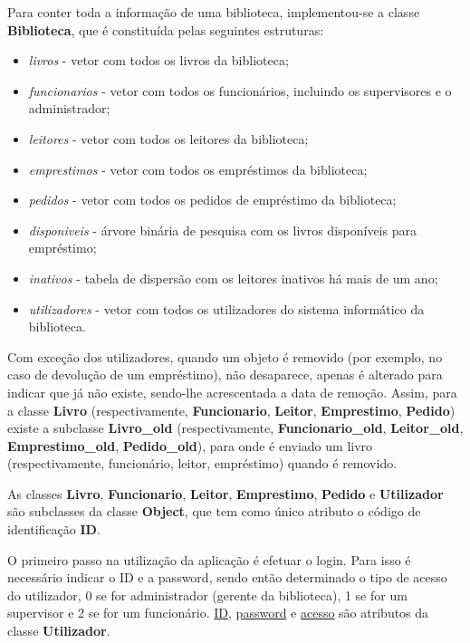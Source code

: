 \documentclass[12pt,a4paper,reqno]{report}
\numberwithin{figure}{section}
\numberwithin{equation}{section}
\begin{document}
Para conter toda a informação de uma biblioteca, implementou-se a classe \textbf{Biblioteca}, que é constituída pelas seguintes estruturas:
\begin{itemize}
\item \textit{livros} - vetor com todos os livros da biblioteca;
\item \textit{funcionarios} - vetor com todos os funcionários, incluindo os supervisores e o administrador;
\item \textit{leitores} - vetor com todos os leitores da biblioteca;
\item \textit{emprestimos} - vetor com todos os empréstimos da biblioteca;
\item \textit{pedidos} - vetor com todos os pedidos de empréstimo da biblioteca;
\item \textit{disponiveis} - árvore binária de pesquisa com os livros disponíveis para empréstimo;
\item \textit{inativos} - tabela de dispersão com os leitores inativos há mais de um ano;
\item \textit{utilizadores} - vetor com todos os utilizadores do sistema informático da biblioteca.
\end{itemize}

Com exceção dos utilizadores, quando um objeto é removido (por exemplo, no caso de devolução de um empréstimo), não desaparece, apenas é alterado para indicar que já não existe, sendo-lhe acrescentada a data de remoção. Assim, para a classe \textbf{Livro} (respectivamente, \textbf{Funcionario}, \textbf{Leitor}, \textbf{Emprestimo}, \textbf{Pedido}) existe a subclasse \textbf{Livro\_old} (respectivamente, \textbf{Funcionario\_old}, \textbf{Leitor\_old}, \textbf{Emprestimo\_old}, \textbf{Pedido\_old}), para onde é enviado um livro (respectivamente, funcionário, leitor, empréstimo) quando é removido.

As classes \textbf{Livro}, \textbf{Funcionario}, \textbf{Leitor}, \textbf{Emprestimo}, \textbf{Pedido} e \textbf{Utilizador} são subclasses da classe \textbf{Object}, que tem como único atributo o código de identificação \textbf{ID}.

O primeiro passo na utilização da aplicação é efetuar o login. Para isso é necessário indicar o ID e a password, sendo então determinado o tipo de acesso do utilizador, 0 se for administrador (gerente da biblioteca), 1 se for um supervisor e 2 se for um funcionário. \underline{ID}, \underline{password} e \underline{acesso} são atributos da classe \textbf{Utilizador}.
\end{document}
